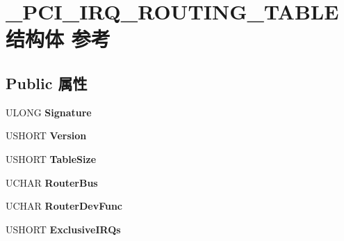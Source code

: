 \hypertarget{struct___p_c_i___i_r_q___r_o_u_t_i_n_g___t_a_b_l_e}{}\section{\+\_\+\+P\+C\+I\+\_\+\+I\+R\+Q\+\_\+\+R\+O\+U\+T\+I\+N\+G\+\_\+\+T\+A\+B\+L\+E结构体 参考}
\label{struct___p_c_i___i_r_q___r_o_u_t_i_n_g___t_a_b_l_e}
\subsection*{Public 属性}
\begin{DoxyCompactItemize}
\item 
\mbox{\label{struct___p_c_i___i_r_q___r_o_u_t_i_n_g___t_a_b_l_e_ab3a4542d04050abb6a32a0a93b5c5950}} 
U\+L\+O\+NG {\bfseries Signature}
\item 
\mbox{\label{struct___p_c_i___i_r_q___r_o_u_t_i_n_g___t_a_b_l_e_a743aedfc9734c289e4c070825bb0063e}} 
U\+S\+H\+O\+RT {\bfseries Version}
\item 
\mbox{\label{struct___p_c_i___i_r_q___r_o_u_t_i_n_g___t_a_b_l_e_add7427981faed99a2f35e46495b176cd}} 
U\+S\+H\+O\+RT {\bfseries Table\+Size}
\item 
\mbox{\label{struct___p_c_i___i_r_q___r_o_u_t_i_n_g___t_a_b_l_e_ac39ead030276a690d03af5df2807b160}} 
U\+C\+H\+AR {\bfseries Router\+Bus}
\item 
\mbox{\label{struct___p_c_i___i_r_q___r_o_u_t_i_n_g___t_a_b_l_e_a6b51343cd01bc3bf30e77fead76385ad}} 
U\+C\+H\+AR {\bfseries Router\+Dev\+Func}
\item 
\mbox{\label{struct___p_c_i___i_r_q___r_o_u_t_i_n_g___t_a_b_l_e_ab291e7e4296cb68fc0b2968845937676}} 
U\+S\+H\+O\+RT {\bfseries Exclusive\+I\+R\+Qs}
\item 
\mbox{\label{struct___p_c_i___i_r_q___r_o_u_t_i_n_g___t_a_b_l_e_a9cf876554adeb1e01d70ea47f9eee0e7}} 

\end{DoxyCompactItemize}
